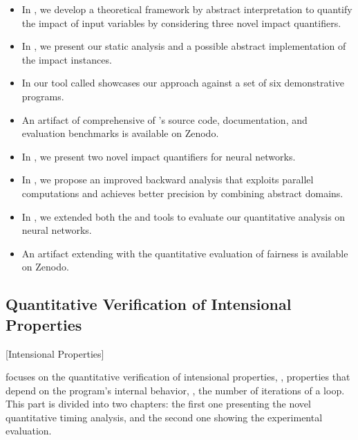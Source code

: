 \begin{itemize}
  \item In , we develop a theoretical framework by abstract interpretation to quantify the impact of input variables by considering three novel impact quantifiers.
  \item In , we present our static analysis and a possible abstract implementation of the impact instances.
  \item In  our tool called \impatto{} showcases our approach against a set of six demonstrative programs.
  \item An artifact of \impatto{} comprehensive of \impatto's source code, documentation, and evaluation benchmarks is available on Zenodo.\sidenote{\impattozenodo}
  \item In , we present two novel impact quantifiers for neural networks.
  \item In , we propose an improved backward analysis that exploits parallel computations and achieves better precision by combining abstract domains.
  \item In , we extended both the \impatto{} and \libra\sidenote{\libraurl} tools to evaluate our quantitative analysis on neural networks.
  \item An artifact extending \libra{} with the quantitative evaluation of fairness is available on Zenodo.\sidenote{\librazenodo}
\end{itemize}

\subsection{Quantitative Verification of Intensional Properties}[Intensional Properties]


 focuses on the quantitative verification of intensional properties, \ie, properties that depend on the program's internal behavior, \eg, the number of iterations of a loop.
This part is divided into two chapters: the first one presenting the novel quantitative timing analysis, and the second one showing the experimental evaluation.

